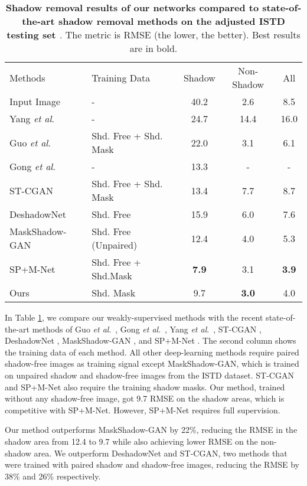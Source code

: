 \documentclass[runningheads]{llncs}
\def\etal{\emph{et al}.}
\begin{document}
\setlength{\tabcolsep}{4pt}
\begin{table}[t]
\begin{center}
\caption{\textbf{Shadow removal results of our networks compared to state-of-the-art shadow removal methods on the adjusted ISTD testing set \cite{Le-etal-ICCV19,Wang_2018_CVPR}}. The metric is RMSE (the lower, the better). Best results are in bold.}
\label{table:headings}
\begin{tabular}{llccc}
\hline\noalign{\smallskip}
Methods   &Training Data                & Shadow& Non-Shadow& All  \\ 
\noalign{\smallskip}
\midrule
\noalign{\smallskip}
Input Image  & -             & 40.2  & 2.6 & 8.5\\ 
\midrule
Yang \etal~\cite{Yang12}   &   -           & 24.7  & 14.4 & 16.0\\ 
Guo \etal~\cite{guoPami}     &   Shd. Free + Shd. Mask  & 22.0  & 3.1 & 6.1\\ 
Gong \etal~\cite{Gong16}            &-& 13.3  & - & -\\ 
ST-CGAN \cite{Wang_2018_CVPR}  & Shd. Free + Shd. Mask  & 13.4  & 7.7 & 8.7\\ 
DeshadowNet \cite{Qu_2017_CVPR} & Shd. Free   & 15.9  & 6.0 & 7.6\\ 
MaskShadow-GAN \cite{hu_iccv2019mask}  &Shd. Free (Unpaired)        & 12.4  & 4.0 & 5.3\\ 
SP+M-Net \cite{Le-etal-ICCV19}& Shd. Free + Shd.Mask & \textbf{7.9}  &3.1 &\textbf{3.9}\\
\midrule
Ours & Shd. Mask & 9.7  &\textbf{3.0} &4.0\\
\hline
\end{tabular}
\end{center}
\end{table}
\setlength{\tabcolsep}{1.4pt}

In Table \ref{table:headings}, we compare our weakly-supervised methods with the recent state-of-the-art methods of Guo \etal~\cite{guoPami}, Gong \etal~\cite{Gong16}, Yang \etal~\cite{Yang12}, ST-CGAN \cite{Wang_2018_CVPR}, DeshadowNet \cite{Qu_2017_CVPR}, MaskShadow-GAN \cite{hu_iccv2019mask}, and SP+M-Net \cite{Le-etal-ICCV19}. The second column shows the training data of each method. All other deep-learning methods require paired shadow-free images as training signal except MaskShadow-GAN, which is trained on unpaired shadow and shadow-free images from the ISTD dataset.   
ST-CGAN and SP+M-Net also require the training shadow masks. Our method, trained without any shadow-free image, got 9.7 RMSE on the shadow areas, which is competitive with SP+M-Net. However, SP+M-Net requires full supervision.
\par Our method outperforms MaskShadow-GAN by 22\%, reducing the RMSE in the shadow area from 12.4 to 9.7 while also achieving lower RMSE on the non-shadow area. We outperform DeshadowNet and ST-CGAN, two methods that were trained with paired shadow and shadow-free images, reducing the RMSE by 38\% and 26\% respectively.
\end{document}
